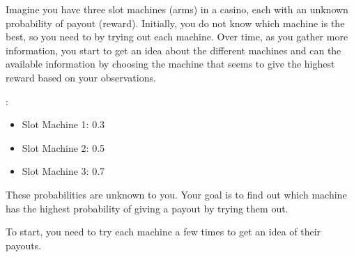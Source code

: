 \documentclass[letterpaper,10pt,english]{jupyterBook}
\begin{document}
\sphinxAtStartPar
{}

\sphinxAtStartPar
Imagine you have three slot machines (arms) in a casino, each with an unknown probability of payout (reward). Initially, you do not know which machine is the best, so you need to  by trying out each machine. Over time, as you gather more information, you start to get an idea about the different machines and can  the available information by choosing the machine that seems to give the highest reward based on your observations.

\sphinxAtStartPar
{}:
\begin{itemize}
\item {} 
\sphinxAtStartPar
Slot Machine 1: 0.3

\item {} 
\sphinxAtStartPar
Slot Machine 2: 0.5

\item {} 
\sphinxAtStartPar
Slot Machine 3: 0.7

\end{itemize}

\sphinxAtStartPar
These probabilities are unknown to you. Your goal is to find out which machine has the highest probability of giving a payout by trying them out.

\sphinxAtStartPar
{}

\sphinxAtStartPar
To start, you need to try each machine a few times to get an idea of their payouts.
\end{document}

